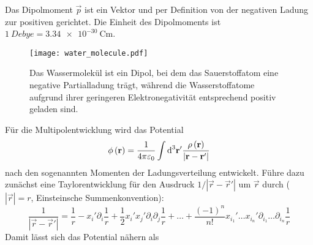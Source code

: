 Das Dipolmoment $\vec {p}$ ist ein Vektor und per Definition von der negativen Ladung zur positiven gerichtet. Die Einheit des Dipolmoments ist $\SI{1}{Debye}=\SI{3,34e-30}{\coulomb\m}$.



\begin{figure}[htb]
	\centering
	\texttt{[image: water\_molecule.pdf]}
	\caption{Das Wassermolekül ist ein Dipol, bei dem das Sauerstoffatom eine negative Partialladung trägt, während die Wasserstoffatome aufgrund ihrer geringeren Elektronegativität entsprechend positiv geladen sind. }
	\label{fig:water_molecule}
\end{figure}

Für die Multipolentwicklung wird das Potential
\begin{equation*}
	\phi \left(\mathbf{r}\right)=\frac{1}{4\pi \varepsilon _{0}}\int \text{d} ^{3}\mathbf{r}'\frac{\rho \left(\mathbf{r}\right)}{\left| \mathbf{r}-\mathbf{r}'\right| }
\end{equation*}
nach den sogenannten Momenten der Ladungsverteilung entwickelt. Führe dazu zunächst eine Taylorentwicklung für den Ausdruck $1/\left| \vec {r}-\vec {r}'\right| $ um $\vec {r}$ durch ($\left| \vec {r}\right| =r$, Einsteinsche Summenkonvention):
\begin{equation*}
	\frac{1}{\left| \vec {r}-\vec {r}'\right| }=\frac{1}{r}-x_{i}'\partial _{i}\frac{1}{r}+\frac{1}{2}x_{i}'x_{j}'\partial _{i}\partial _{j}\frac{1}{r}+\ldots +\frac{\left(-1\right)^{n}}{n!}x_{i_{1}}'\ldots x_{i_{n}}'\partial _{{i_{1}}}\ldots \partial _{{i_{n}}}\frac{1}{r}
\end{equation*}
Damit lässt sich das Potential nähern als
